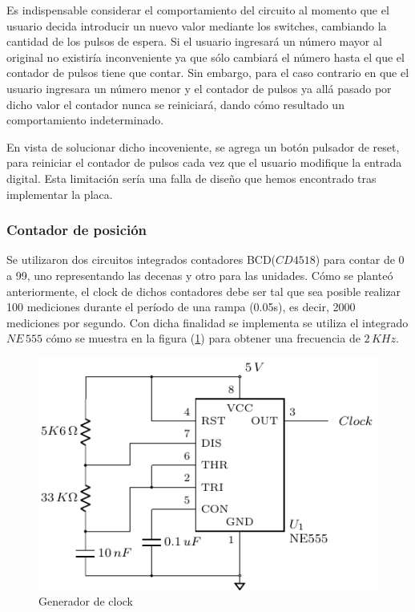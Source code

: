 Es indispensable considerar el comportamiento del circuito al momento que el usuario decida introducir un nuevo valor mediante los switches,  cambiando la cantidad de los pulsos de espera. Si el usuario ingresará un número mayor al original no existiría inconveniente ya que sólo cambiará el número hasta el que el contador de pulsos tiene que contar. Sin embargo, para el caso contrario en que el usuario ingresara un número menor y el contador de pulsos ya allá pasado por dicho valor el contador nunca se reiniciará, dando cómo resultado un comportamiento indeterminado.

En vista de solucionar dicho incoveniente, se agrega un botón pulsador de reset, para reiniciar el contador de pulsos cada vez que el usuario modifique la entrada digital.
Esta limitación sería una falla de diseño que hemos encontrado tras implementar la placa.




\subsubsection{Contador de posición}

Se utilizaron dos circuitos integrados  contadores BCD($CD4518$) para contar de 0 a 99, uno representando las decenas y otro para las unidades. 
Cómo se planteó anteriormente, el clock de dichos contadores debe ser tal que sea posible realizar 100 mediciones durante el período de una rampa (0.05s), es decir, 2000 mediciones por segundo. Con dicha finalidad se implementa se utiliza el integrado $NE\,555$ cómo se muestra en la figura (\ref{fig:Clock}) para obtener una frecuencia de $2\,KHz$.

\begin{figure}[H]
\centering
\includegraphics[scale=0.8]{Ejercicio8/Circuitos/Clock.pdf}
\caption{Generador de clock}
\label{fig:Clock}
\end{figure}

